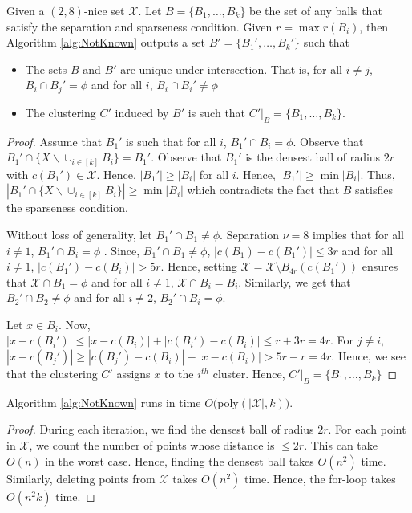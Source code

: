 \documentclass[11pt]{article}
\begin{document}
\begin{theorem}
Given a $(2,8)$-nice set $\mathcal{X}$. Let $B = \{B_1,\ldots,B_k\}$ be the set of any balls that satisfy the separation and sparseness condition. Given $r = \max r(B_i)$, then Algorithm \ref{alg:NotKnown} outputs a set $B' = \{B_1',\ldots,B_k'\}$ such that 
\begin{itemize}
	\item The sets $B$ and $B'$ are unique under intersection. That is, for all $i\neq j$, $B_i \cap B_j' = \phi$ and for all $i$, $B_i \cap B_i' \neq \phi$
	\item The clustering $C'$ induced by $B'$ is such that $C'|_B = \{B_1,\ldots,B_k\}$.	
\end{itemize}

\end{theorem}
\begin{proof}
Assume that $B_1'$ is such that for all $i$, $B_1' \cap B_i = \phi$. Observe that $B_1' \cap \{X \backslash \cup_{i\in[k]} B_i\} = B_1'$. Observe that $B_1'$ is the densest ball of radius $2r$ with $c(B_1') \in \mathcal{X}$. Hence, $|B_1'| \ge |B_i|$ for all $i$. Hence, $|B_1'| \ge \min |B_i|$. Thus, $|B_1' \cap \{X \backslash \cup_{i\in[k]} B_i\}| \ge \min |B_i|$ which contradicts the fact that $B$ satisfies the sparseness condition. 

Without loss of generality, let $B_1' \cap B_1 \neq \phi$. Separation $\nu = 8$ implies that for all $i\neq 1$, $B_1' \cap B_i = \phi$ . Since, $B_1' \cap B_1 \neq \phi$, $|c(B_1)-c(B_1')| \le 3r$ and for all $i\neq 1$, $|c(B_1')-c(B_i)| > 5r$. Hence, setting $\mathcal{X} = \mathcal{X}\setminus B_{4r}(c(B_1'))$ ensures that $\mathcal{X} \cap B_1 = \phi$ and for all $i\neq 1$, $\mathcal{X} \cap B_i = B_i$. Similarly, we get that $B_2' \cap B_2 \neq \phi$ and for all $i \neq 2$, $B_2' \cap B_i = \phi$.

Let $x \in B_i$. Now, $|x-c(B_i')| \le |x-c(B_i)| + |c(B_i')-c(B_i)| \le r+3r = 4r$. For $j \neq i$, $|x-c(B_j')| \ge |c(B_j')-c(B_i)| - |x-c(B_i)| > 5r - r = 4r$. Hence, we see that the clustering $C'$ assigns $x$ to the $i^{th}$ cluster. Hence, $C'|_B = \{B_1,\ldots,B_k\}$
\end{proof}

\begin{theorem}
Algorithm \ref{alg:NotKnown} runs in time $O($poly$(|\mathcal{X}|,k))$.
\end{theorem}
\begin{proof}
During each iteration, we find the densest ball of radius $2r$. For each point in $\mathcal{X}$, we count the number of points whose distance is $\le 2r$. This can take $O(n)$ in the worst case. Hence, finding the densest ball takes $O(n^2)$ time. Similarly, deleting points from $\mathcal{X}$ takes $O(n^2)$ time. Hence, the for-loop takes $O(n^2k)$ time.
\end{proof}
\end{document}
